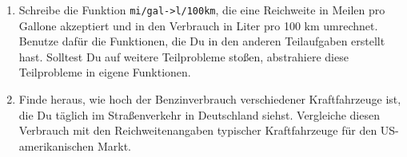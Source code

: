 \begin{aufgabe}
\begin{enumerate}
  \item Schreibe die Funktion
    \lstinline{mi/gal->l/100km}, die eine Reichweite in Meilen pro
    Gallone akzeptiert und in den Verbrauch in Liter pro 100 km
    umrechnet.  Benutze dafür die Funktionen, die Du in den
    anderen Teilaufgaben erstellt hast.  Solltest Du auf weitere
    Teilprobleme stoßen, abstrahiere diese Teilprobleme in eigene
    Funktionen.

  \item Finde heraus, wie hoch der Benzinverbrauch
    verschiedener Kraftfahrzeuge ist, die Du täglich im
    Straßenverkehr in Deutschland siehst.  Vergleiche diesen
    Verbrauch mit den Reichweitenangaben typischer Kraftfahrzeuge für
    den US-amerikanischen Markt.
  \end{enumerate}

\end{aufgabe}


